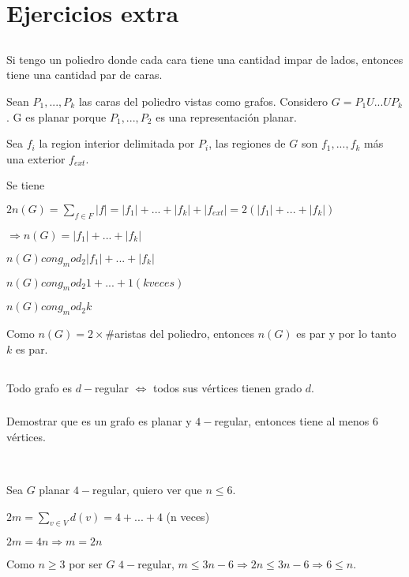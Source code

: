 \section{Ejercicios extra}

\subsection{}
Si tengo un poliedro donde cada cara tiene una cantidad impar de lados, entonces tiene una cantidad par de caras.

Sean $P_1, ..., P_k$ las caras del poliedro vistas como grafos. Considero $G = P_1 U ... U P_k$. G es planar porque $P_1, ..., P_2$ es una representación planar.

Sea $f_i$ la region interior delimitada por $P_i$, las regiones de $G$ son $f_1, ..., f_k$ más una exterior $f_{ext}$.

Se tiene 

\begin{center}
    $2n(G) = \sum_{f \in F}|f| = |f_1| + ... + |f_k| + |f_{ext}| = 2(|f_1| + ... + |f_k|)$

    $\Longrightarrow n(G) = |f_1| + ... + |f_k|$

    $n(G) cong_mod_2 |f_1| + ... + |f_k|$

    $n(G) cong_mod_2 1 + ... + 1 (k veces)$

    $n(G) cong_mod_2 k$
\end{center}

Como $n(G) = 2 \times \#$aristas del poliedro, entonces $n(G)$ es par y por lo tanto $k$ es par.

\subsection{}
Todo grafo es $d-$regular $\Longleftrightarrow$ todos sus vértices tienen grado $d$.

\subsubsection{}
Demostrar que es un grafo es planar y $4-$regular, entonces tiene al menos 6 vértices.

~

Sea $G$ planar $4-$regular, quiero ver que $n \leq 6$.

$2m = \sum_{v \in V}d(v) = 4 + ... + 4$ (n veces)

$2m = 4n \Longrightarrow m = 2n$

Como $n \geq 3$ por ser $G$ $4-$regular, $m \leq 3n - 6 \Longrightarrow 2n \leq 3n - 6 \Longrightarrow 6 \leq n$.

